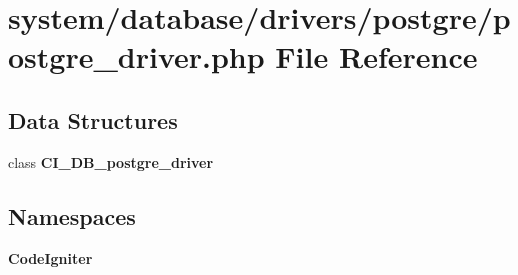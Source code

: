 \section{system/database/drivers/postgre/postgre\-\_\-driver.php File Reference}
\label{postgre__driver_8php}
\subsection*{Data Structures}
\begin{DoxyCompactItemize}
\item 
class {\bf C\-I\-\_\-\-D\-B\-\_\-postgre\-\_\-driver}
\end{DoxyCompactItemize}
\subsection*{Namespaces}
\begin{DoxyCompactItemize}
\item 
{\bf Code\-Igniter}
\end{DoxyCompactItemize}
